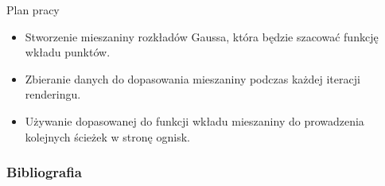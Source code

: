 \documentclass{beamer}
\begin{document}
\begin{frame}{Plan pracy}
    \begin{itemize}
        \item Stworzenie mieszaniny rozkładów Gaussa, która będzie szacować funkcję wkładu punktów.
        \item Zbieranie danych do dopasowania mieszaniny podczas każdej iteracji renderingu.
        \item Używanie dopasowanej do funkcji wkładu mieszaniny do prowadzenia kolejnych ścieżek w stronę ognisk.
    \end{itemize}
\end{frame}


\begin{frame}
    \frametitle{Bibliografia}
    \nocite{*}
    \printbibliography
\end{frame}
\end{document}
